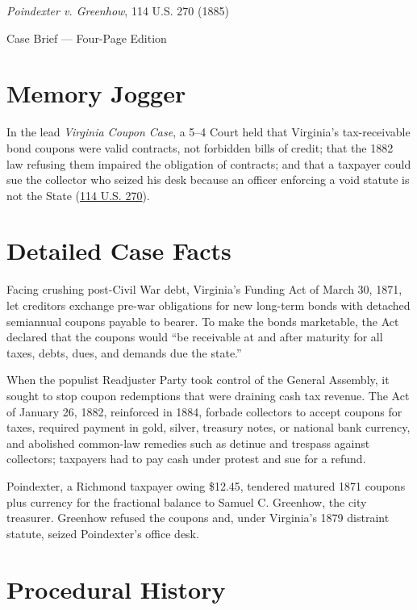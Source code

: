 \documentclass[12pt]{article}
\begin{document}
\begin{center}
{\LARGE \textit{Poindexter v. Greenhow}, 114 U.S. 270 (1885)\par}
\vspace{0.8em}
{\large Case Brief --- Four-Page Edition\par}
\end{center}
\vspace{1em}

\section{Memory Jogger}

In the lead \textit{Virginia Coupon Case}, a 5--4 Court held that Virginia's tax-receivable bond coupons were valid contracts, not forbidden bills of credit; that the 1882 law refusing them impaired the obligation of contracts; and that a taxpayer could sue the collector who seized his desk because an officer enforcing a void statute is not the State (\href{https://supreme.justia.com/cases/federal/us/114/270/}{114 U.S. 270}).

\section{Detailed Case Facts}

Facing crushing post-Civil War debt, Virginia's Funding Act of March 30, 1871, let creditors exchange pre-war obligations for new long-term bonds with detached semiannual coupons payable to bearer. To make the bonds marketable, the Act declared that the coupons would ``be receivable at and after maturity for all taxes, debts, dues, and demands due the state.''

When the populist Readjuster Party took control of the General Assembly, it sought to stop coupon redemptions that were draining cash tax revenue. The Act of January 26, 1882, reinforced in 1884, forbade collectors to accept coupons for taxes, required payment in gold, silver, treasury notes, or national bank currency, and abolished common-law remedies such as detinue and trespass against collectors; taxpayers had to pay cash under protest and sue for a refund.

Poindexter, a Richmond taxpayer owing \$12.45, tendered matured 1871 coupons plus currency for the fractional balance to Samuel C. Greenhow, the city treasurer. Greenhow refused the coupons and, under Virginia's 1879 distraint statute, seized Poindexter's office desk.

\section{Procedural History}
\end{document}

